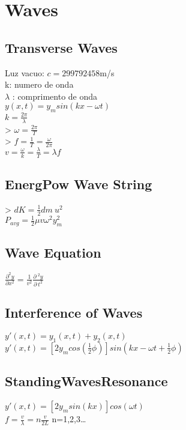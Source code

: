 \section{Waves}
\subsection{Transverse Waves}
Luz vacuo: 
$c=299792458$m/s\\
k: numero de onda\\
$\lambda$ : comprimento de onda\\
$y\left(x,t\right)=y_msin\left(kx-\omega t\right)$\\
$k=\frac{2\pi }{\lambda }$\\
> $\omega =\frac{2\pi }{T}$\\
> $f=\frac{1}{T}=\frac{\omega }{2\pi }$\\
$v=\frac{\omega }{k}=\frac{\lambda }{T}=\lambda f$\\
\subsection{EnergPow Wave String}
> $dK=\frac{1}{2}dm\:u^2$\\
$P_{avg}=\frac{1}{2}\mu v\omega ^2y_m^2$\\
\subsection{Wave Equation}
$\frac{\partial ^2y}{\partial x^2}=\frac{1}{v^2}\frac{\partial \:^2y}{\partial \:t^2}$\\
\subsection{Interference of Waves}
$y'\left(x,t\right)=y_1\left(x,t\right)+y_2\left(x,t\right)$\\
$y'\left(x,t\right)=\left[2y_mcos\left(\frac{1}{2}\phi \right)\right]sin\left(kx-\omega t+\frac{1}{2}\phi \right)$\\
\subsection{StandingWavesResonance}
$y'\left(x,t\right)=\left[2y_msin\left(kx\right)\right]cos\left(\omega t\right)$\\
$f=\frac{v}{\lambda }=n\frac{v}{2L}$ n=1,2,3\dots\\
